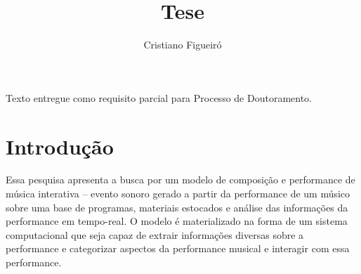 \documentclass[draft]{ppgmus}
\begin{document}
 


\capa
\begin{dadosTese}
Texto entregue como requisito parcial para Processo de Doutoramento.
\end{dadosTese}


\title{Tese}
\author{Cristiano Figueiró}



\tableofcontents

\newpage

%  
% 
% 
% 
% 
% 

\chapter{Introdução}
\label{sec:intro}


Essa pesquisa apresenta a busca por um modelo de composição e
performance de música interativa – evento sonoro gerado a partir da
performance de um músico sobre uma base de programas, materiais
estocados e análise das informações da performance em tempo-real. O
modelo é materializado na forma de um sistema computacional que seja
capaz de extrair informações diversas sobre a performance e
categorizar aspectos da performance musical e interagir com essa performance.
\end{document}
